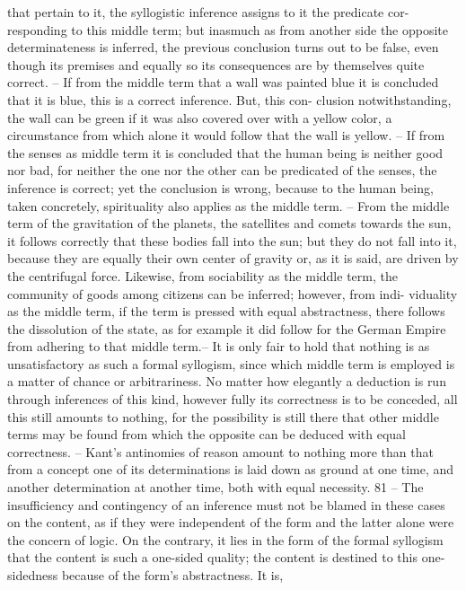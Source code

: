 that pertain to it, the syllogistic inference assigns to it the predicate cor-
responding to this middle term; but inasmuch as from another side the
opposite determinateness is inferred, the previous conclusion turns out to
be false, even though its premises and equally so its consequences are by
themselves quite correct. – If from the middle term that a wall was painted
blue it is concluded that it is blue, this is a correct inference. But, this con-
clusion notwithstanding, the wall can be green if it was also covered over
with a yellow color, a circumstance from which alone it would follow that
the wall is yellow. – If from the senses as middle term it is concluded that
the human being is neither good nor bad, for neither the one nor the other
can be predicated of the senses, the inference is correct; yet the conclusion
is wrong, because to the human being, taken concretely, spirituality also
applies as the middle term. – From the middle term of the gravitation of
the planets, the satellites and comets towards the sun, it follows correctly
that these bodies fall into the sun; but they do not fall into it, because they
are equally their own center of gravity or, as it is said, are driven by
the centrifugal force. Likewise, from sociability as the middle term, the
community of goods among citizens can be inferred; however, from indi-
viduality as the middle term, if the term is pressed with equal abstractness,
there follows the dissolution of the state, as for example it did follow for
the German Empire from adhering to that middle term.– It is only fair
to hold that nothing is as unsatisfactory as such a formal syllogism, since
which middle term is employed is a matter of chance or arbitrariness. No
matter how elegantly a deduction is run through inferences of this kind,
however fully its correctness is to be conceded, all this still amounts to
nothing, for the possibility is still there that other middle terms may be
found from which the opposite can be deduced with equal correctness. –
Kant’s antinomies of reason amount to nothing more than that from a
concept one of its determinations is laid down as ground at one time, and
another determination at another time, both with equal necessity. 81 – The
insufficiency and contingency of an inference must not be blamed in these
cases on the content, as if they were independent of the form and the latter
alone were the concern of logic. On the contrary, it lies in the form of the
formal syllogism that the content is such a one-sided quality; the content
is destined to this one-sidedness because of the form’s abstractness. It is,
